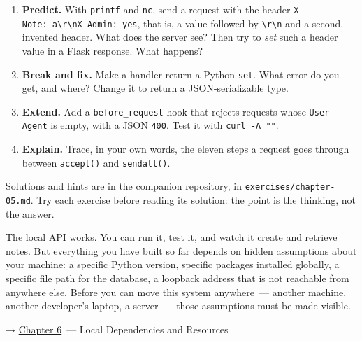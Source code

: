 \label{05-internal-request-execution:exercises}

\begin{enumerate}
\def\labelenumi{\arabic{enumi}.}
\tightlist
\item
  \textbf{Predict.} With \texttt{printf} and \texttt{nc}, send a request with the header \texttt{X-}\allowbreak{}\texttt{Note:}\allowbreak{}\texttt{\ a\textbackslash{}r\textbackslash{}nX-}\allowbreak{}\texttt{Admin:}\allowbreak{}\texttt{\ yes}, that is, a value followed by \texttt{\textbackslash{}r\textbackslash{}n} and a second, invented header. What does the server see? Then try to \emph{set} such a header value in a Flask response. What happens?
\item
  \textbf{Break and fix.} Make a handler return a Python \texttt{set}. What error do you get, and where? Change it to return a JSON-serializable type.
\item
  \textbf{Extend.} Add a \texttt{before\_request} hook that rejects requests whose \texttt{User-Agent} is empty, with a JSON \texttt{400}. Test it with \texttt{curl\ -A\ ""}.
\item
  \textbf{Explain.} Trace, in your own words, the eleven steps a request goes through between \texttt{accept()} and \texttt{sendall()}.
\end{enumerate}

\noindent{}Solutions and hints are in the companion repository, in \texttt{exercises/}\allowbreak{}\texttt{chapter-05.md}. Try each exercise before reading its solution: the point is the thinking, not the answer.

\label{05-internal-request-execution:whats-next}

The local API works. You can run it, test it, and watch it create and retrieve notes. But everything you have built so far depends on hidden assumptions about your machine: a specific Python version, specific packages installed globally, a specific file path for the database, a loopback address that is not reachable from anywhere else. Before you can move this system anywhere~--- another machine, another developer's laptop, a server~--- those assumptions must be made visible.

\noindent{}→ \hyperref[ch:06-local-dependencies]{Chapter 6}~--- Local Dependencies and Resources
